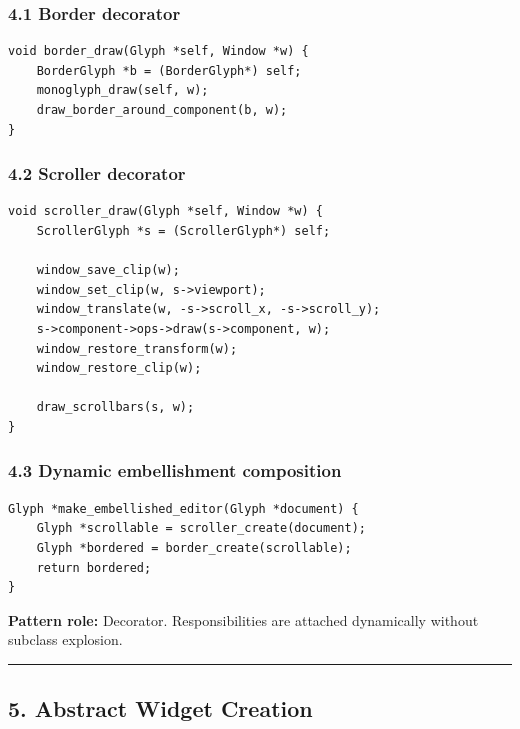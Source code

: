 \documentclass[11pt]{article}
\begin{document}
\subsubsection{4.1 Border decorator}\label{border-decorator}

\begin{verbatim}
void border_draw(Glyph *self, Window *w) {
    BorderGlyph *b = (BorderGlyph*) self;
    monoglyph_draw(self, w);
    draw_border_around_component(b, w);
}
\end{verbatim}

\subsubsection{4.2 Scroller decorator}\label{scroller-decorator}

\begin{verbatim}
void scroller_draw(Glyph *self, Window *w) {
    ScrollerGlyph *s = (ScrollerGlyph*) self;

    window_save_clip(w);
    window_set_clip(w, s->viewport);
    window_translate(w, -s->scroll_x, -s->scroll_y);
    s->component->ops->draw(s->component, w);
    window_restore_transform(w);
    window_restore_clip(w);

    draw_scrollbars(s, w);
}
\end{verbatim}

\subsubsection{4.3 Dynamic embellishment composition}\label{dynamic-embellishment-composition}

\begin{verbatim}
Glyph *make_embellished_editor(Glyph *document) {
    Glyph *scrollable = scroller_create(document);
    Glyph *bordered = border_create(scrollable);
    return bordered;
}
\end{verbatim}

\textbf{Pattern role:} Decorator. Responsibilities are attached dynamically without subclass explosion.

\begin{center}\rule{0.5\linewidth}{0.5pt}\end{center}

\subsection{5. Abstract Widget Creation}\label{abstract-widget-creation}
\end{document}
